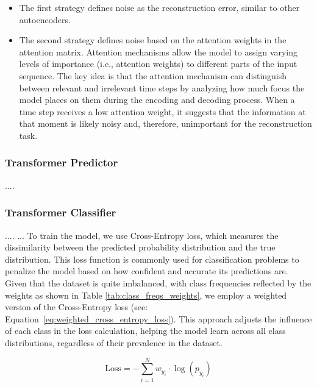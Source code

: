 \begin{itemize}
    \item The first strategy defines noise as the reconstruction error, similar to other autoencoders.
    \vspace{-0.2cm}
    \item The second strategy defines noise based on the attention weights in the attention matrix. Attention mechanisms allow the model to assign varying levels of importance (i.e., attention weights) to different parts of the input sequence. The key idea is that the attention mechanism can distinguish between relevant and irrelevant time steps by analyzing how much focus the model places on them during the encoding and decoding process. When a time step receives a low attention weight, it suggests that the information at that moment is likely noisy and, therefore, unimportant for the reconstruction task.
\end{itemize}

\subsubsection{Transformer Predictor}
....

\subsubsection{Transformer Classifier}
....
...
To train the model, we use Cross-Entropy loss, which measures the dissimilarity between the predicted probability distribution and the true distribution. This loss function is commonly used for classification problems to penalize the model based on how confident and accurate its predictions are. Given that the dataset is quite imbalanced, with class frequencies reflected by the weights as shown in Table \ref{tab:class_freqs_weights}, we employ a weighted version of the Cross-Entropy loss (see: Equation~\ref{eq:weighted_cross_entropy_loss}). This approach adjusts the influence of each class in the loss calculation, helping the model learn across all class distributions, regardless of their prevalence in the dataset.

\begin{equation}
    \text{Loss} = -\sum_{i=1}^{N} w_{y_i} \cdot \log(p_{y_i})
    \label{eq:weighted_cross_entropy_loss}
\end{equation}

